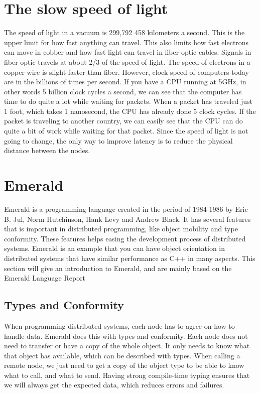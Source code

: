 
\section{The slow speed of light}
The speed of light in a vacuum is 299,792 458 kilometers a second. This is the upper limit for how fast anything can travel. This also limits how fast electrons can move in cobber and how fast light can travel in fiber-optic cables. Signals in fiber-optic travels at about 2/3 of the speed of light. The speed of electrons in a copper wire is slight faster than fiber. However, clock speed of computers today are in the billions of times per second. If you have a CPU running at 5GHz, in other words 5 billion clock cycles a second, we can see that the computer has time to do quite a lot while waiting for packets. When a packet has traveled just 1 foot, which takes 1 nanosecond, the CPU has already done 5 clock cycles. If the packet is traveling to another country, we can easily see that the CPU can do quite a bit of work while waiting for that packet. Since the speed of light is not going to change, the only way to improve latency is to reduce the physical distance between the nodes.











\section{Emerald}\label{Emerald}
Emerald is a programming language created in the period of 1984-1986 by Eric B. Jul, Norm Hutchinson, Hank Levy and Andrew Black. It has several features that is important in distributed programming, like object mobility and type conformity. These features helps easing the development process of distributed systems. Emerald is an example that you can have object orientation in distributed systems that have similar performance as C++ in many aspects. This section will give an introduction to Emerald, and are mainly based on the Emerald Language Report\cite{hutchinson_emerald_nodate}

\subsection{Types and Conformity}
When programming distributed systems, each node has to agree on how to handle data. Emerald does this with types and conformity. Each node does not need to transfer or have a copy of the whole object. It only needs to know what that object has available, which can be described with types. When calling a remote node, we just need to get a copy of the object type to be able to know what to call, and what to send. Having strong compile-time typing ensures that we will always get the expected data, which reduces errors and failures.

